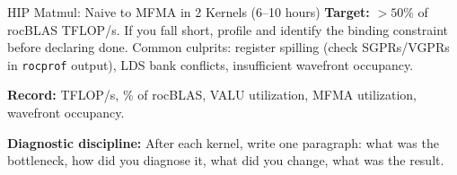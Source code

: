 \begin{exercise}{HIP Matmul: Naive to MFMA in 2 Kernels (6--10 hours)}
\textbf{Target:} $>50\%$ of rocBLAS TFLOP/s. If you fall short, profile and identify the binding constraint before declaring done. Common culprits: register spilling (check SGPRs/VGPRs in \texttt{rocprof} output), LDS bank conflicts, insufficient wavefront occupancy.

\textbf{Record:} TFLOP/s, \% of rocBLAS, VALU utilization, MFMA utilization, wavefront occupancy.

\medskip
\textbf{Diagnostic discipline:} After each kernel, write one paragraph: what was the bottleneck, how did you diagnose it, what did you change, what was the result.
\end{exercise}

\newpage
